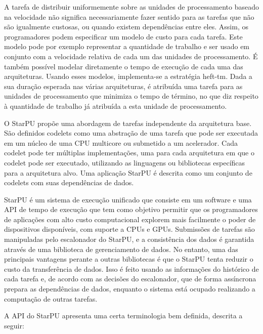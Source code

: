 A tarefa de distribuir uniformemente sobre as unidades de processamento baseado na velocidade não significa necessariamente fazer sentido para as tarefas que não são igualmente custosas, ou quando existem dependências entre eles. Assim, os programadores podem especificar um modelo de custo para cada tarefa. Este modelo pode por exemplo representar a quantidade de trabalho e ser usado em conjunto com a velocidade relativa de cada um das unidades de processamento. É também possível modelar diretamente o tempo de execução de cada uma das arquiteturas. Usando esses modelos, implementa-se a estratégia heft-tm. Dada a sua duração esperada nas várias arquiteturas, é atribuída uma tarefa para as unidades de processamento que minimiza o tempo de término, no que diz respeito à quantidade de trabalho já atribuída a esta unidade de processamento.

 O StarPU propõe uma abordagem de tarefas independente da arquitetura base. São definidos codelets como uma abstração de uma tarefa que pode ser executada em um núcleo de uma CPU multicore ou submetido a um acelerador. Cada codelet pode ter múltiplas implementações, uma para cada arquitetura em que o codelet pode ser executado, utilizando as linguagens ou bibliotecas específicas para a arquitetura alvo. Uma aplicação StarPU é descrita como um conjunto de codelets com suas dependências de dados.

StarPU é um sistema de execução unificado que consiste em um software e uma API de tempo de execução que tem como objetivo permitir que os programadores de aplicações com alto custo  computacional explorem mais facilmente o poder de dispositivos disponíveis, com suporte a CPUs e GPUs. Submissões de tarefas são manipuladas pelo escalonador do StarPU, e a consistência dos dados é garantida através de uma biblioteca de gerenciamento de dados. 
No entanto, uma das principais vantagens perante a outras bibliotecas é que o StarPU tenta reduzir o custo da transferência de dados. Isso é feito usando as informações do histórico de cada tarefa e, de acordo com as decisões do escalonador, que de forma assíncrona prepara as dependências de dados, enquanto o sistema está ocupado realizando a computação de outras tarefas. 

A API do StarPU apresenta uma certa terminologia bem definida, descrita a seguir:

